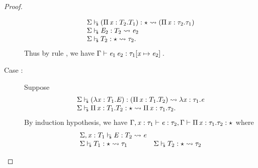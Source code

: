 \begin{proof}
\begin{description}
\[\begin{array}{l}
               \Sigma  \vdash_{\!\!\mathsf{s} }  (  \Pi \, \mathit{x}  :  T_{{\mathrm{2}}}  .  T_{{\mathrm{1}}}  )  :  \star   \rightsquigarrow   (  \Pi \, \mathit{x}  :  \tau_{{\mathrm{2}}}  .  \tau_{{\mathrm{1}}}  )  \\
               \Sigma  \vdash_{\!\!\mathsf{s} }  \mathit{E_{{\mathrm{2}}}}  :  T_{{\mathrm{2}}}   \rightsquigarrow   \mathit{e_{{\mathrm{2}}}}  \\
               \Sigma  \vdash_{\!\!\mathsf{s} }  T_{{\mathrm{2}}}  :  \star   \rightsquigarrow   \tau_{{\mathrm{2}}} .
            \end{array}\] Thus by rule , we have $\Gamma  \vdash  \mathit{e_{{\mathrm{1}}}} \, \mathit{e_{{\mathrm{2}}}}  :  \tau_{{\mathrm{1}}}  [  \mathit{x}  \mapsto  \mathit{e_{{\mathrm{2}}}}  ] \,$.
        \item[Case \ruleref{TR\_Lam}:] Suppose
            \[\begin{array}{l}
             \Sigma  \vdash_{\!\!\mathsf{s} }  (  \lambda  \mathit{x}  :  T_{{\mathrm{1}}}  .  \mathit{E}  )  :  (  \Pi \, \mathit{x}  :  T_{{\mathrm{1}}}  .  T_{{\mathrm{2}}}  )   \rightsquigarrow   \lambda  \mathit{x}  :  \tau_{{\mathrm{1}}}  .  \mathit{e}  \\ 
             \Sigma  \vdash_{\!\!\mathsf{s} }  \Pi \, \mathit{x}  :  T_{{\mathrm{1}}}  .  T_{{\mathrm{2}}}  :  \star   \rightsquigarrow   \Pi \, \mathit{x}  :  \tau_{{\mathrm{1}}}  .  \tau_{{\mathrm{2}}} .
            \end{array} \]
            By induction hypothesis, we have 
            $
            \Gamma  ,  \mathit{x}  :  \tau_{{\mathrm{1}}}  \vdash  \mathit{e}  :  \tau_{{\mathrm{2}}},
            \Gamma  \vdash  \Pi \, \mathit{x}  :  \tau_{{\mathrm{1}}}  .  \tau_{{\mathrm{2}}}  :  \star
            $
            where 
            \[
            \begin{array}{ll}
             \Sigma  ,  \mathit{x}  :  T_{{\mathrm{1}}}  \vdash_{\!\!\mathsf{s} }  \mathit{E}  :  T_{{\mathrm{2}}}   \rightsquigarrow   \mathit{e}  & \\
             \Sigma  \vdash_{\!\!\mathsf{s} }  T_{{\mathrm{1}}}  :  \star   \rightsquigarrow   \tau_{{\mathrm{1}}}  &  \Sigma  \vdash_{\!\!\mathsf{s} }  T_{{\mathrm{2}}}  :  \star   \rightsquigarrow   \tau_{{\mathrm{2}}}  \\

\end{array}\]
\end{description}
\end{proof}
